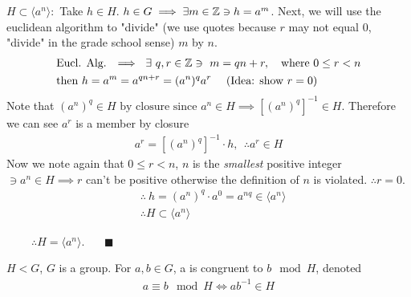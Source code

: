 \begin{proposition}
\begin{enumerate}
    \noindent $ H\subset\langle a^n \rangle :$ Take $h\in H$.
    $h\in G \implies \exists m\in{\mathbb{Z}} \ni h=a^m$. Next, we will use the euclidean algorithm to
    "divide" (we use quotes because $r$ may not equal $0$, "divide" in the grade school sense) $m$
    by $n$.
    \begin{align}
        &\text{Eucl. Alg. } \implies \ \exists \ q,r\in \Z \ni \ m=qn+r, \ \ \text{ where } 0\leq r < n \nonumber \\
        &\text{then  }h=a^m=a^{qn+r}=(a^n)^q a^r \ \ \ \ (\text{Idea: show }r=0)\nonumber
    \end{align}
    Note that $(a^n)^q \in H \text{ by closure since } a^n \in H \implies [(a^n)^q]^{-1}\in H$.
    Therefore we can see $a^r$ is a member by closure
    \begin{align}
        a^r=[(a^n)^q]^{-1}\cdot h, \ \ \therefore a^r\in H \nonumber
    \end{align}
    Now we note again that $0\leq r < n$, $n$ is the \textit{smallest} positive integer
    $\ni a^n\in H \implies r$ can't be positive otherwise the definition of $n$ is violated.
    $\therefore r=0$.
    \begin{align}
        &\therefore \ h= (a^n)^q\cdot a^0 = a^{nq}\in \langle a^n \rangle \nonumber \\
        &\therefore H\subset \langle a^n \rangle \nonumber
    \end{align}
\end{enumerate}
\indent $\ \ \ \ \ \ \ \ \ \ \therefore H=\langle a^n \rangle.  \ \ \ \ \ \ \ \ \blacksquare$
\end{proposition}

\begin{definition}
$H<G$, $G$ is a group. For $a,b\in G$, a is congruent to $b\mod H$, denoted
\begin{align}
    a\equiv b \mod H \iff ab^{-1}\in H \nonumber
    \end{align}
\end{definition}

